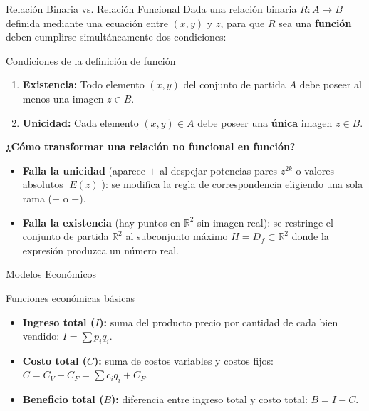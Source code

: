 \documentclass[aspectratio=169,10pt]{beamer}
\begin{document}
\begin{frame}{Relación Binaria vs. Relación Funcional}
  Dada una relación binaria $R : A \longrightarrow B$ definida mediante una ecuación entre $(x,y)$ y $z$, para que $R$ sea una \textbf{función} deben cumplirse simultáneamente dos condiciones:

  \vspace{0.2cm}
  \begin{block}{Condiciones de la definición de función}
    \begin{enumerate}
      \item \textbf{Existencia:} Todo elemento $(x,y)$ del conjunto de partida $A$ debe poseer al menos una imagen $z \in B$.
      \item \textbf{Unicidad:} Cada elemento $(x,y) \in A$ debe poseer una \textbf{única} imagen $z \in B$.
    \end{enumerate}
  \end{block}

  \vspace{0.2cm}
  \textbf{¿Cómo transformar una relación no funcional en función?}
  \begin{itemize}
    \item \textbf{Falla la unicidad} (aparece $\pm$ al despejar potencias pares $z^{2k}$ o valores absolutos $|E(z)|$): se modifica la regla de correspondencia eligiendo una sola rama ($+$ o $-$).
    \item \textbf{Falla la existencia} (hay puntos en $\mathbb{R}^2$ sin imagen real): se restringe el conjunto de partida $\mathbb{R}^2$ al subconjunto máximo $H = D_f \subset \mathbb{R}^2$ donde la expresión produzca un número real.
  \end{itemize}
\end{frame}

\begin{frame}{Modelos Económicos}
  \begin{block}{Funciones económicas básicas}
    \begin{itemize}
      \item \textbf{Ingreso total ($I$):} suma del producto precio por cantidad de cada bien vendido: $I = \sum p_i q_i$.
      \item \textbf{Costo total ($C$):} suma de costos variables y costos fijos: $C = C_V + C_F = \sum c_i q_i + C_F$.
      \item \textbf{Beneficio total ($B$):} diferencia entre ingreso total y costo total: $B = I - C$.
    \end{itemize}
  \end{block}
  \vfill
\end{frame}
\end{document}
